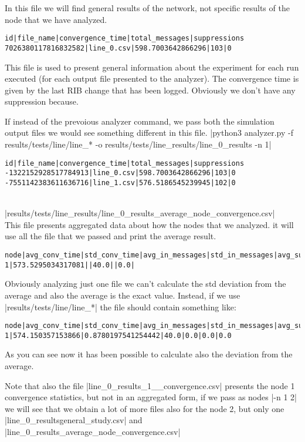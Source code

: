 \documentclass[10pt,journal,onecolumn]{IEEEtran}
\begin{document}
In this file we will find general results of the network, not specific results
of the node that we have analyzed.

\begin{lstlisting}[language=csv]
id|file_name|convergence_time|total_messages|suppressions
7026380117816832582|line_0.csv|598.7003642866296|103|0
\end{lstlisting}

This file is used to present general information about the experiment for each
run executed (for each output file presented to the analyzer).
The convergence time is given by the last RIB change that has been logged.
Obviously we don't have any suppression because.

If instead of the prevoious analyzer command, we pass both the simulation output
files we would see something different in this file.
|python3 analyzer.py -f results/tests/line/line_* -o results/tests/line_results/line_0_results -n 1|
\begin{lstlisting}[language=csv]
id|file_name|convergence_time|total_messages|suppressions
-1322152928517784913|line_0.csv|598.7003642866296|103|0
-7551142383611636716|line_1.csv|576.5186545239945|102|0
\end{lstlisting}\\

|results/tests/line_results/line_0_results_average_node_convergence.csv|\\

This file presents aggregated data about how the nodes that we analyzed. it will
use all the file that we passed and print the average result.
\begin{lstlisting}[language=csv]
node|avg_conv_time|std_conv_time|avg_in_messages|std_in_messages|avg_suppressed_routes|std_suppressed_routes
1|573.5295034317081||40.0||0.0|
\end{lstlisting}
Obviously analyzing just one file we can't calculate the std deviation from the
average and also the average is the exact value.
Instead, if we use |results/tests/line/line_*| the file should contain something
like:
\begin{lstlisting}[language=csv]
node|avg_conv_time|std_conv_time|avg_in_messages|std_in_messages|avg_suppressed_routes|std_suppressed_routes
1|574.150357153866|0.8780197541254442|40.0|0.0|0.0|0.0
\end{lstlisting}
As you can see now it has been possible to calculate also the deviation from the
average.

Note that also the file |line_0_results_1__convergence.csv| presents the node 1
convergence statistics, but not in an aggregated form, 
if we pass as nodes |-n 1 2| we will see that we obtain a lot of more files
also for the node 2, but only one |line_0_resultsgeneral_study.csv| and |line_0_results_average_node_convergence.csv|\\
\end{document}
